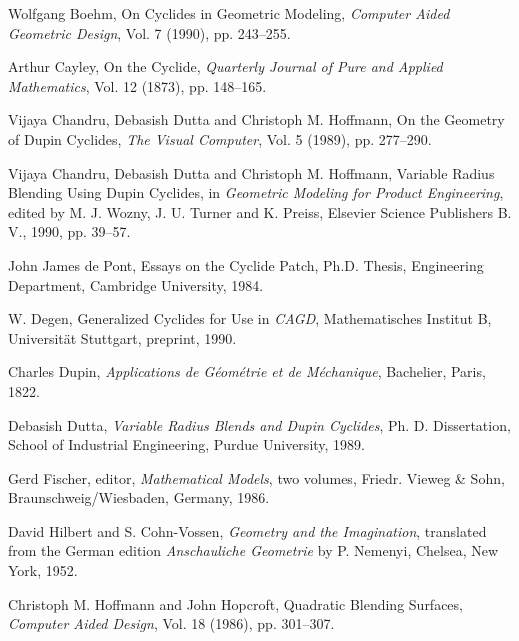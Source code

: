 \begin{thebibliography}{999}

     Wolfgang Boehm,
     On Cyclides in Geometric Modeling,
     {\em Computer Aided Geometric Design},
     Vol. 7 (1990), pp. 243--255.

     Arthur Cayley,
     On the Cyclide,
     {\em Quarterly Journal of Pure and Applied Mathematics},
     Vol. 12 (1873), pp. 148--165.

     Vijaya Chandru, Debasish Dutta and Christoph M. Hoffmann,
     On the Geometry of Dupin Cyclides,
     {\em The Visual Computer},
     Vol. 5 (1989), pp. 277--290.

     Vijaya Chandru, Debasish Dutta and Christoph M. Hoffmann,
     Variable Radius Blending Using Dupin Cyclides,
     in {\em Geometric Modeling for Product Engineering},
     edited by M. J. Wozny, J. U. Turner and K. Preiss,
     Elsevier Science Publishers B. V., 1990, pp. 39--57.

     John James de Pont,
     Essays on the Cyclide Patch,
     Ph.D. Thesis,
     Engineering Department, Cambridge University, 1984.

     W. Degen,
     Generalized Cyclides for Use in {\em CAGD},
     Mathematisches Institut B, Universit\"{a}t Stuttgart,
     preprint, 1990.

     Charles Dupin,
     {\em Applications de G\'{e}om\'{e}trie et de M\'{e}chanique},
     Bachelier, Paris, 1822.
     
     Debasish Dutta,
     {\em Variable Radius Blends and Dupin Cyclides},
     Ph. D. Dissertation,
     School of Industrial Engineering, Purdue University, 1989.

     Gerd Fischer, editor,
     {\em Mathematical Models}, two volumes,
     Friedr. Vieweg \& Sohn,
     Braunschweig/Wiesbaden, Germany, 1986.

     David Hilbert and S. Cohn-Vossen,
     {\em Geometry and the Imagination},
     translated from the German edition {\em Anschauliche Geometrie} by
          P. Nemenyi,
     Chelsea, New York, 1952.

     Christoph M. Hoffmann and John Hopcroft,
     Quadratic Blending Surfaces,
     {\em Computer Aided Design},
     Vol. 18 (1986), pp. 301--307.


\end{thebibliography}
